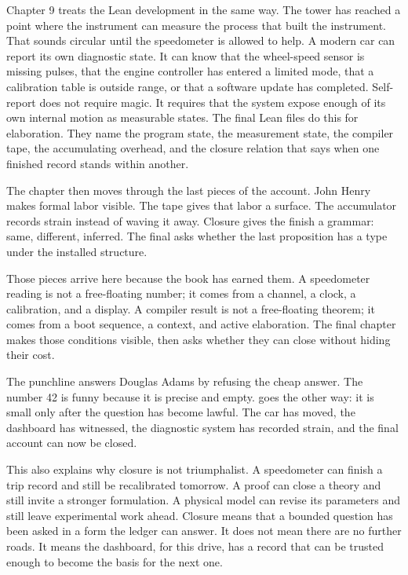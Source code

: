 Chapter 9 treats the Lean development in the same way. The tower has reached a
point where the instrument can measure the process that built the instrument.
That sounds circular until the speedometer is allowed to help. A modern car can
report its own diagnostic state. It can know that the wheel-speed sensor is
missing pulses, that the engine controller has entered a limited mode, that a
calibration table is outside range, or that a software update has completed.
Self-report does not require magic. It requires that the system expose enough
of its own internal motion as measurable states. The final Lean files do this
for elaboration. They name the program state, the measurement state, the
compiler tape, the accumulating overhead, and the closure relation that says
when one finished record stands within another.

The chapter then moves through the last pieces of the account. John Henry makes
formal labor visible. The tape gives that labor a surface. The accumulator
records strain instead of waving it away. Closure gives the finish a grammar:
same, different, inferred. The final  asks whether the last
proposition has a type under the installed structure.

Those pieces arrive here because the book has earned them. A speedometer
reading is not a free-floating number; it comes from a channel, a clock, a
calibration, and a display. A compiler result is not a free-floating theorem;
it comes from a boot sequence, a context, and active elaboration. The final
chapter makes those conditions visible, then asks whether they can close
without hiding their cost.

The punchline answers Douglas Adams by refusing the cheap answer. The number
42 is funny because it is precise and empty.  goes the
other way: it is small only after the question has become lawful. The car has
moved, the dashboard has witnessed, the diagnostic system has recorded strain,
and the final account can now be closed.

This also explains why closure is not triumphalist. A speedometer can finish a
trip record and still be recalibrated tomorrow. A proof can close a theory and
still invite a stronger formulation. A physical model can revise its
parameters and still leave experimental work ahead. Closure means that a
bounded question has been asked in a form the ledger can answer. It does not
mean there are no further roads. It means the dashboard, for this drive, has a
record that can be trusted enough to become the basis for the next one.

